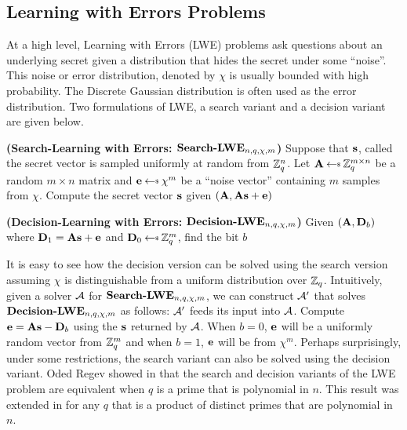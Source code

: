 \subsection{Learning with Errors Problems}
At a high level, Learning with Errors (LWE) problems ask questions about an underlying secret given a distribution that hides the secret under some ``noise''. This noise or error distribution, denoted by $\chi$ is usually bounded with high probability. The Discrete Gaussian distribution is often used as the error distribution. Two formulations of LWE, a search variant and a decision variant are given below.

\begin{problem}
\textnormal{\textbf{(Search-Learning with Errors: $\textbf{Search-LWE}_{n,q,\chi,m}$)}} Suppose that $\mathbf{s}$, called the secret vector is sampled uniformly at random from ${{\mathbb Z}}^n_q$. Let $\varvect{A} \getsr \Z^{m \times n}_q$ be a random $m \times n$ matrix and $\varvect{e} \getsr \chi^m$ be a ``noise vector'' containing $m$ samples from $\chi$. Compute the secret vector $\mathbf{s}$ given $\left(\mathbf{A}, \mathbf{A}\mathbf{s} + \mathbf{e} \right)$
\end{problem}

\begin{problem}
\textnormal{\textbf{(Decision-Learning with Errors: $\textbf{Decision-LWE}_{n,q,\chi,m}$)}}
Given $(\mathbf{A}, \mathbf{D}_b)$ where $\mathbf{D}_1 = \mathbf{A}\mathbf{s} + \mathbf{e}$ and $\varvect{D}_0 \getsr \Z^m_q$, find the bit $b$
\end{problem}

\noindent It is easy to see how the decision version can be solved using the search version assuming $\chi$ is distinguishable from a uniform distribution over ${{\mathbb Z}}_q$. Intuitively, given a solver ${\mathcal A}$ for $\textbf{Search-LWE}_{n,q,\chi,m}$, we can construct ${\mathcal A}'$ that solves $\textbf{Decision-LWE}_{n,q,\chi,m}$ as follows: ${\mathcal A}'$ feeds its input into ${\mathcal A}$. Compute $\mathbf{e} = \mathbf{A}\mathbf{s} - \mathbf{D}_b$ using the $\mathbf{s}$ returned by ${\mathcal A}$. When $b=0$, $\mathbf{e}$ will be a uniformly random vector from ${{\mathbb Z}}^m_q$ and when $b=1$, $\mathbf{e}$ will be from $\chi^m$. Perhaps surprisingly, under some restrictions, the search variant can also be solved using the decision variant. Oded Regev showed in \cite{Regev2005} that the search and decision variants of the LWE problem are equivalent when $q$ is a prime that is polynomial in $n$. This result was extended in \cite{Peikert2009} for any $q$ that is a product of distinct primes that are polynomial in $n$.

